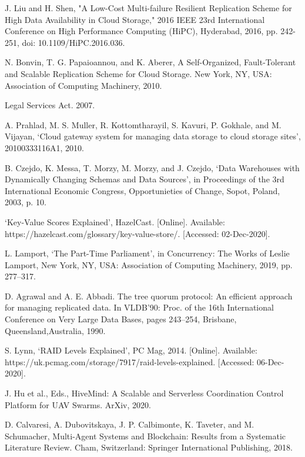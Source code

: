 \documentclass{UoYCSproject}
\begin{document}
\begin{thebibliography}{100}
J. Liu and H. Shen, "A Low-Cost Multi-failure Resilient Replication Scheme for High Data Availability in Cloud Storage," 2016 IEEE 23rd International Conference on High Performance Computing (HiPC), Hyderabad, 2016, pp. 242-251, doi: 10.1109/HiPC.2016.036.

N. Bonvin, T. G. Papaioannou, and K. Aberer, A Self-Organized, Fault-Tolerant and Scalable Replication Scheme for Cloud Storage. New York, NY, USA: Association of Computing Machinery, 2010.

Legal Services Act. 2007.

A. Prahlad, M. S. Muller, R. Kottomtharayil, S. Kavuri, P. Gokhale, and M. Vijayan, ‘Cloud gateway system for managing data storage to cloud storage sites’, 20100333116A1, 2010.

B. Czejdo, K. Messa, T. Morzy, M. Morzy, and J. Czejdo, ‘Data Warehouses with Dynamically Changing Schemas and Data Sources’, in Proceedings of the 3rd International Economic Congress, Opportunieties of Change, Sopot, Poland, 2003, p. 10.

‘Key-Value Scores Explained’, HazelCast. [Online]. Available: https://hazelcast.com/glossary/key-value-store/. [Accessed: 02-Dec-2020].

L. Lamport, ‘The Part-Time Parliament’, in Concurrency: The Works of Leslie Lamport, New York, NY, USA: Association of Computing Machinery, 2019, pp. 277–317.

D. Agrawal and A. E. Abbadi. The tree quorum protocol: An efficient approach for managing replicated data. In VLDB’90: Proc. of the 16th International Conference on Very Large Data Bases, pages 243–254, Brisbane, Queensland,Australia, 1990.

S. Lynn, ‘RAID Levels Explained’, PC Mag, 2014. [Online]. Available: https://uk.pcmag.com/storage/7917/raid-levels-explained. [Accessed: 06-Dec-2020].

J. Hu et al., Eds., HiveMind: A Scalable and Serverless Coordination Control Platform for UAV Swarms. ArXiv, 2020.

D. Calvaresi, A. Dubovitskaya, J. P. Calbimonte, K. Taveter, and M. Schumacher, Multi-Agent Systems and Blockchain: Results from a Systematic Literature Review. Cham, Switzerland: Springer International Publishing, 2018.

\end{thebibliography}
\end{document}
